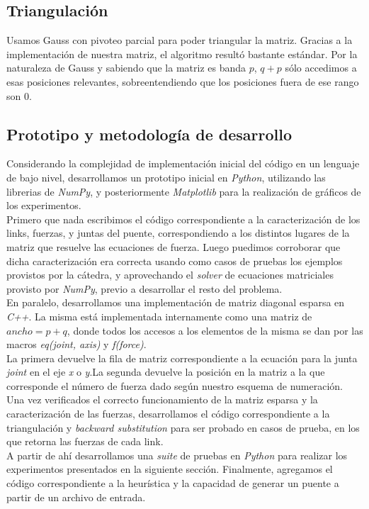 \subsection{Triangulación}

Usamos Gauss con pivoteo parcial para poder triangular la matriz. Gracias a la implementación de nuestra matriz, el algoritmo resultó bastante estándar. Por la naturaleza de Gauss y sabiendo que la matriz es banda $p$, $q + p$ sólo accedimos a esas posiciones relevantes, sobreentendiendo que los posiciones fuera de ese rango son $0$.

 \subsection{Prototipo y metodología de desarrollo}

Considerando la complejidad de implementación inicial del código en un lenguaje de bajo nivel, desarrollamos un prototipo inicial en \textit{Python}, utilizando las librerias de \textit{NumPy}, y posteriormente \textit{Matplotlib} para la realización de gráficos de los experimentos.\\

Primero que nada escribimos el código correspondiente a la caracterización de los links, fuerzas, y juntas del puente, correspondiendo a los distintos lugares de la matriz que resuelve las ecuaciones de fuerza. Luego puedimos corroborar que dicha caracterización era correcta usando como casos de pruebas los ejemplos provistos por la cátedra, y aprovechando el \textit{solver} de ecuaciones matriciales provisto por \textit{NumPy}, previo a desarrollar el resto del problema.\\

En paralelo, desarrollamos una implementación de matriz diagonal esparsa en \textit{C++}. La misma está implementada internamente como una matriz de $ancho = p + q$, donde todos los accesos a los elementos de la misma se dan por las macros \textit{eq(joint, axis)} y \textit{f(force)}.\\

La primera devuelve la fila de matriz correspondiente a la ecuación para la junta \textit{joint} en el eje \textit{x} o \textit{y}.La segunda devuelve la posición en la matriz a la que corresponde el número de fuerza dado según nuestro esquema de numeración.\\

Una vez verificados el correcto funcionamiento de la matriz esparsa y la caracterización de las fuerzas, desarrollamos el código correspondiente a la triangulación y \textit{backward substitution} para ser probado en casos de prueba, en los que retorna las fuerzas de cada link.\\

A partir de ahí desarrollamos una \textit{suite} de pruebas en \textit{Python} para realizar los experimentos presentados en la siguiente sección. Finalmente, agregamos el código correspondiente a la heurística y la capacidad de generar un puente a partir de un archivo de entrada.


